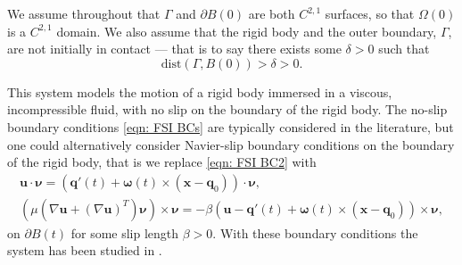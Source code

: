 \documentclass[a4paper]{amsart}
\numberwithin{equation}{section}
\newcommand{\grad}{\nabla}
\theoremstyle{plain}
\newcommand{\mbf}[1]{\mathbf{#1}}
\begin{document}
We assume throughout that $\Gamma$ and $\partial B(0)$ are both $C^{2,1}$ surfaces, so that $\Omega(0)$ is a $C^{2,1}$ domain.
We also assume that the rigid body and the outer boundary, $\Gamma$, are not initially in contact --- that is to say there exists some $\delta > 0$ such that
\[ \mathrm{dist}(\Gamma, B(0)) > \delta > 0. \]

This system models the motion of a rigid body immersed in a viscous, incompressible fluid, with no slip on the boundary of the rigid body.
The no-slip boundary conditions \eqref{eqn: FSI BCs} are  typically considered in the literature, but one could alternatively consider Navier-slip boundary conditions on the boundary of the rigid body, that is we replace \eqref{eqn: FSI BC2} with
\begin{subequations}
\label{eqn: slip BCs}
\begin{gather}
	\mbf{u} \cdot \boldsymbol{\nu} = \left(\mbf{q}'(t) + \boldsymbol{\omega}(t) \times (\mbf{x} - \mbf{q}_0)\right) \cdot \boldsymbol{\nu}, \label{eqn: slip BC1}\\
	\left(\mu \left( \grad \mbf{u} + (\grad \mbf{u})^T \right) \boldsymbol{\nu}\right) \times \boldsymbol{\nu} = -\beta \left( \mbf{u} - \mbf{q}'(t) + \boldsymbol{\omega}(t) \times (\mbf{x} - \mbf{q}_0) \right) \times \boldsymbol{\nu}, \label{eqn: slip BC2}
\end{gather}
\end{subequations}
on $\partial B(t)$ for some slip length $\beta > 0$.
With these boundary conditions the system has been studied in \cite{al2018strong,chemetov2017motion,gerard2014existence}.
\end{document}
